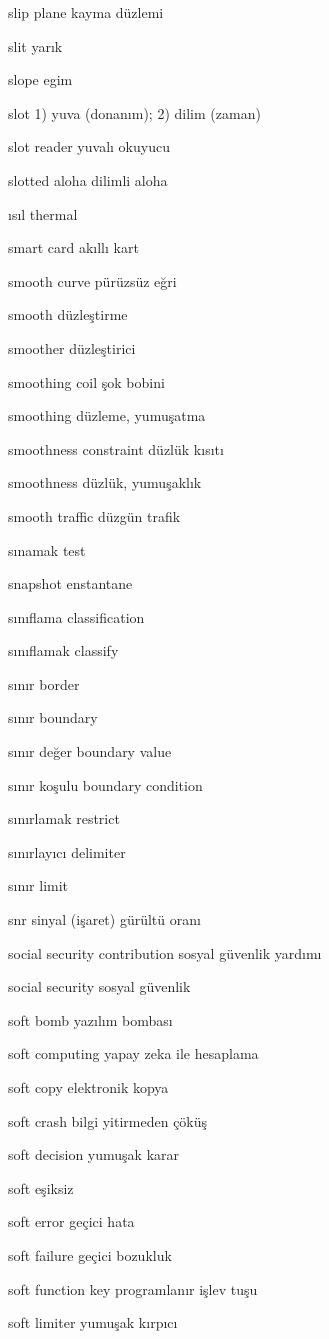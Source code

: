 \documentclass[12pt,fleqn]{article}\usepackage{../../common}
\begin{document}
slip plane kayma düzlemi

slit yarık

slope egim

slot 1) yuva (donanım); 2) dilim (zaman)

slot reader yuvalı okuyucu

slotted aloha dilimli aloha

ısıl thermal

smart card akıllı kart

smooth curve pürüzsüz eğri

smooth düzleştirme

smoother düzleştirici

smoothing coil şok bobini

smoothing düzleme, yumuşatma

smoothness constraint düzlük kısıtı

smoothness düzlük, yumuşaklık

smooth traffic düzgün trafik

sınamak test

snapshot enstantane

sınıflama classification

sınıflamak classify

sınır border

sınır boundary

sınır değer boundary value

sınır koşulu boundary condition

sınırlamak restrict

sınırlayıcı delimiter

sınır limit

snr sinyal (işaret) gürültü oranı

social security contribution sosyal güvenlik yardımı

social security sosyal güvenlik

soft bomb yazılım bombası

soft computing yapay zeka ile hesaplama

soft copy elektronik kopya

soft crash bilgi yitirmeden çöküş

soft decision yumuşak karar

soft eşiksiz

soft error geçici hata

soft failure geçici bozukluk

soft function key programlanır işlev tuşu

soft limiter yumuşak kırpıcı
\end{document}
